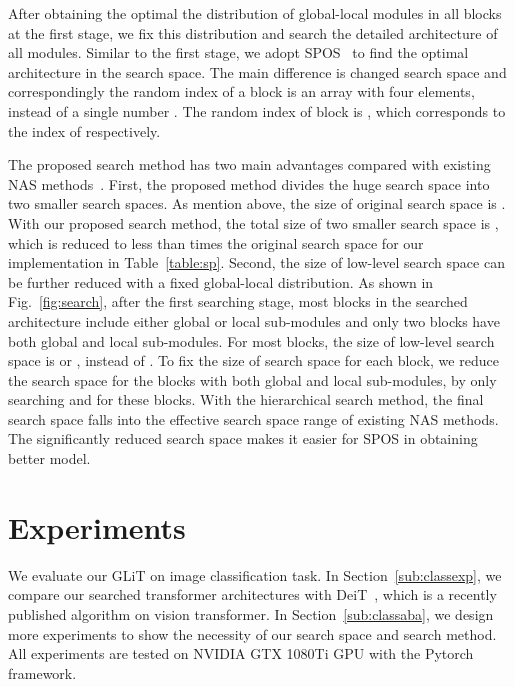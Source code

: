 \documentclass[10pt,twocolumn,letterpaper]{article}
\begin{document}
\vspace{-1mm}
{}
After obtaining the optimal the distribution of global-local modules in all blocks at the first stage, we fix this distribution and search the detailed architecture of all modules.
Similar to the first stage, we adopt SPOS~\cite{SPOS-ECCV20-Guo} to find the optimal architecture  in the search space. The main difference is changed search space and correspondingly the random index of a block is an array with four elements, instead of a single number . The random index of block  is , which corresponds to the index of  respectively.

The proposed search method has two main advantages compared with existing NAS methods~\cite{SPOS-ECCV20-Guo, Darts-ICLR19-Liu}. First, the proposed method divides the huge search space into two smaller search spaces.  As mention above, the size of original search space is . With our proposed search method, the total size of two smaller search space is , which is reduced to less than  times the original search space for our implementation in Table~\ref{table:sp}. Second, the size of low-level search space  can be further reduced with a fixed global-local distribution. As shown in Fig.~\ref{fig:search}, after the first searching stage, most blocks in the searched architecture include either global or local sub-modules and only two blocks have both global and local sub-modules. For most blocks, the size of low-level search space is  or , instead of . To fix the size of search space for each block, we reduce the search space for the blocks with both global and local sub-modules, by only searching  and  for these blocks. With the hierarchical search method, the final search space falls into the effective search space range of existing NAS methods. The significantly reduced search space makes it easier for SPOS in obtaining better model.



\section{Experiments}
We evaluate our GLiT on image classification task.
In Section~\ref{sub:classexp}, we compare our searched transformer architectures with DeiT~\cite{deit}, which is a recently published algorithm on vision transformer. 
In Section~\ref{sub:classaba}, we design more experiments to show the necessity of our search space and search method.
All experiments are tested on NVIDIA GTX 1080Ti GPU with the Pytorch framework.
\end{document}
